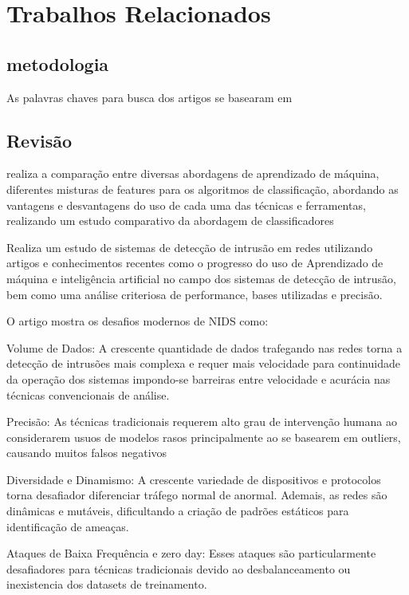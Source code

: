 \documentclass[conference]{IEEEtran}
\begin{document}
\section{Trabalhos Relacionados}

\subsection{metodologia}

  As palavras chaves para busca dos artigos se basearam em 

\subsection{Revisão}


    \cite{1} realiza a comparação entre diversas abordagens de aprendizado de máquina, diferentes misturas de features para os algoritmos de classificação, abordando as  vantagens e desvantagens do uso de cada uma das técnicas e ferramentas, realizando um estudo
    comparativo da abordagem de classificadores

    \cite{2} Realiza um estudo de sistemas de detecção de intrusão em redes utilizando artigos e conhecimentos recentes como o progresso do uso de Aprendizado de máquina e inteligência artificial no campo dos sistemas de detecção de intrusão, bem como uma análise criteriosa de performance, bases utilizadas e precisão.

    \cite{3} O artigo mostra os desafios modernos de NIDS como:

    Volume de Dados: A crescente quantidade de dados trafegando nas redes torna a detecção de intrusões mais complexa e requer mais velocidade para continuidade da operação dos sistemas impondo-se barreiras entre velocidade e acurácia nas técnicas convencionais de análise.
    
    Precisão: As técnicas tradicionais requerem alto grau de intervenção humana ao considerarem usuos de modelos rasos principalmente ao se basearem em outliers, causando muitos falsos negativos
    
    Diversidade e Dinamismo: A crescente variedade de dispositivos e protocolos torna desafiador diferenciar tráfego normal de anormal. Ademais, as redes são dinâmicas e mutáveis, dificultando a criação de padrões estáticos para identificação de ameaças.
    
    Ataques de Baixa Frequência e zero day: Esses ataques são particularmente desafiadores para técnicas tradicionais devido ao desbalanceamento ou inexistencia dos datasets de treinamento.
\end{document}

